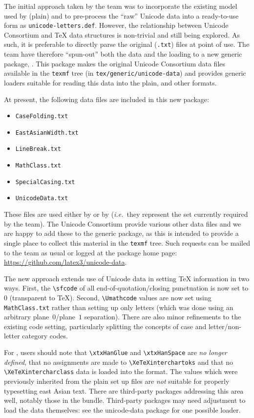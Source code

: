 \documentclass{ltnews}
\begin{document}
The initial approach taken by the team was to incorporate the existing model
used by (plain)  and to pre-process the ``raw'' Unicode data into
a ready-to-use form as \verb|unicode-letters.def|. However, the relationship
between Unicode Consortium and \TeX{} data structures is non-trivial and still
being explored. As such, it is preferable to directly parse the original
(\verb|.txt|) files at point of use. The team have therefore ``spun-out'' both
the data and the loading to a new generic package, . This
package makes the original Unicode Consortium data files available in the
\verb|texmf| tree (in \verb|tex/generic/unicode-data|) and provides generic
loaders suitable for reading this data into the plain, \LaTeXe{} and other
formats.

At present, the following data files are included in this new package:
\begin{itemize}
  \item \verb|CaseFolding.txt|
  \item \verb|EastAsianWidth.txt|
  \item \verb|LineBreak.txt|
  \item \verb|MathClass.txt|
  \item \verb|SpecialCasing.txt|
  \item \verb|UnicodeData.txt|
\end{itemize}
These files are used either by \LaTeXe{} or by 
(\emph{i.e.}~they represent the set currently required by the team). The
Unicode Consortium provide various other data files and we are happy to add
these to the generic package, as this is intended to provide a single place
to collect this material in the \verb|texmf| tree. Such requests can be
mailed to the team as usual or logged at the package home page:
\url{https://github.com/latex3/unicode-data}.

The new approach extends use of Unicode data in setting \TeX{} information in
two ways. First, the \verb|\sfcode| of all end-of-quotation/closing punctuation
is now set to $0$ (transparent to \TeX{}). Second, \verb|\Umathcode| values are
now set using \verb|MathClass.txt| rather than setting up only letters (which
was done using an arbitrary plane~$0$/plane~$1$ separation). There are also
minor refinements to the existing code setting, particularly splitting the
concepts of case and letter/non-letter category codes.

For , users should note that \verb|\xtxHanGlue| and
\verb|\xtxHanSpace| are \emph{no longer defined}, that no assignments are made
to \verb|\XeTeXinterchartoks| and that no \verb|\XeTeXintercharclass| data is
loaded into the format. The values which were previously inherited from
the plain  set up files are \emph{not} suitable for properly
typesetting east Asian text. There are third-party packages addressing this
area well, notably those in the  bundle. Third-party packages
may need adjustment to load the data themselves: see the \textsf{unicode-data}
package for one possible loader.
\end{document}
